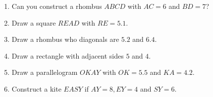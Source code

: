 \begin{enumerate}[label=\thesection.\arabic*.,ref=\thesection.\theenumi]
\item Can you construct a rhombus $ABCD$ with $AC = 6$ and $BD = 7$?
\item Draw a square $READ$ with $RE = 5.1$.
\item Draw a rhombus who diagonals are $5.2$ and $6.4$.
\item Draw a rectangle with adjacent sides $5$ and $4$.
\item Draw a parallelogram $OKAY$ with $OK = 5.5$ and $KA = 4.2$.
\item Construct a kite $EASY$ if $AY = 8, EY = 4$ and $SY = 6$.


\end{enumerate}
%
